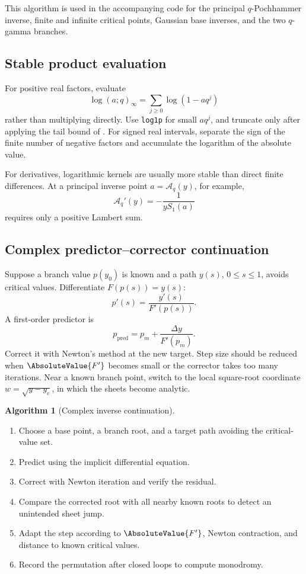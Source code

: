 \documentclass[11pt,oneside]{article}
\theoremstyle{definition}
\newtheorem{algorithm}[theorem]{Algorithm}
\theoremstyle{remark}
\theoremstyle{plain}
\theoremstyle{definition}
\theoremstyle{remark}
\newcommand{\Aq}{\mathcal A_q}
\numberwithin{equation}{section}
\numberwithin{figure}{section}
\numberwithin{table}{section}
\let\reportsubsection\subsection
\let\reportsubsubsection\subsubsection
\let\section\reportsubsection
\let\subsection\reportsubsubsection
\begin{document}
This algorithm is used in the accompanying code for the principal
\(q\)-Pochhammer inverse, finite and infinite critical points, Gaussian base
inverses, and the two \(q\)-gamma branches.

\section{Stable product evaluation}
For positive real factors, evaluate
\[
 \log(a;q)_\infty=\sum_{j\ge0}\log(1-aq^j)
\]
rather than multiplying directly.  Use \texttt{log1p} for small \(aq^j\), and
truncate only after applying the tail bound of .
For signed real intervals, separate the sign of the finite number of negative
factors and accumulate the logarithm of the absolute value.

For derivatives, logarithmic kernels are usually more stable than direct
finite differences.  At a principal inverse point \(a=\Aq(y)\), for example,
\[
 \Aq'(y)=-\frac1{yS_1(a)}
\]
requires only a positive Lambert sum.

\section{Complex predictor--corrector continuation}
Suppose a branch value \(p(y_0)\) is known and a path
\(y(s)\), \(0\le s\le1\), avoids critical values.  Differentiate
\(F(p(s))=y(s)\):
\[
 p'(s)=\frac{y'(s)}{F'(p(s))}.
\]
A first-order predictor is
\[
 p_{\mathrm{pred}}=p_m+\frac{\Delta y}{F'(p_m)}.
\]
Correct it with Newton's method at the new target.  Step size should be reduced
when \(\AbsoluteValue{F'}\) becomes small or the corrector takes too many iterations.
Near a known branch point, switch to the local square-root coordinate
\(w=\sqrt{y-y_c}\), in which the sheets become analytic.

\begin{algorithm}[Complex inverse continuation]
\begin{enumerate}[label=\arabic*.]
\item Choose a base point, a branch root, and a target path avoiding the
critical-value set.
\item Predict using the implicit differential equation.
\item Correct with Newton iteration and verify the residual.
\item Compare the corrected root with all nearby known roots to detect an
unintended sheet jump.
\item Adapt the step according to \(\AbsoluteValue{F'}\), Newton contraction, and distance
to known critical values.
\item Record the permutation after closed loops to compute monodromy.
\end{enumerate}
\end{algorithm}
\end{document}
